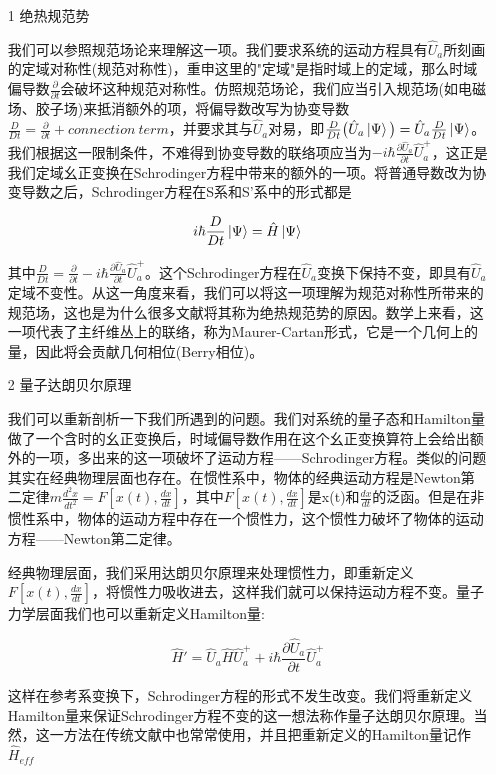 \documentclass[a4paper]{article}
\begin{document}
        \begin{itemize}
        \item[1] 绝热规范势 
            
            我们可以参照规范场论来理解这一项。我们要求系统的运动方程具有$\hat{U}_a$所刻画的定域对称性(规范对称性)，重申这里的"定域"是指时域上的定域，那么时域偏导数$\frac{\partial}{\partial t}$会破坏这种规范对称性。仿照规范场论，我们应当引入规范场(如电磁场、胶子场)来抵消额外的项，将偏导数改写为协变导数$\frac{D}{Dt}=\frac{\partial}{\partial t}+connection\ term$，并要求其与$\hat{U}_a$对易，即$\frac{D}{Dt}\big(\hat{U}_a\ket{\Psi}\big)=\hat{U}_a\frac{D}{Dt}\ket{\Psi}$。我们根据这一限制条件，不难得到协变导数的联络项应当为$-i\hbar\frac{\partial\hat{U}_a}{\partial t}\hat{U}_a^+$，这正是我们定域幺正变换在Schrodinger方程中带来的额外的一项。将普通导数改为协变导数之后，Schrodinger方程在S系和S'系中的形式都是

            \begin{equation}
                i\hbar\frac{D}{Dt}\ket{\Psi} = \hat{H}\ket{\Psi}
            \end{equation}

            其中$\frac{D}{Dt}=\frac{\partial}{\partial t}-i\hbar\frac{\partial\hat{U}_a}{\partial t}\hat{U}_a^+$。这个Schrodinger方程在$\hat{U}_a$变换下保持不变，即具有$\hat{U}_a$定域不变性。从这一角度来看，我们可以将这一项理解为规范对称性所带来的规范场，这也是为什么很多文献将其称为绝热规范势的原因。数学上来看，这一项代表了主纤维丛上的联络，称为Maurer-Cartan形式，它是一个几何上的量，因此将会贡献几何相位(Berry相位)。
        
        \item[2] 量子达朗贝尔原理
            
            我们可以重新剖析一下我们所遇到的问题。我们对系统的量子态和Hamilton量做了一个含时的幺正变换后，时域偏导数作用在这个幺正变换算符上会给出额外的一项，多出来的这一项破坏了运动方程——Schrodinger方程。类似的问题其实在经典物理层面也存在。在惯性系中，物体的经典运动方程是Newton第二定律$m\frac{d^2x}{dt^2}=F[x(t),\frac{dx}{dt}]$，其中$F[x(t),\frac{dx}{dt}]$是x(t)和$\frac{dx}{dt}$的泛函。但是在非惯性系中，物体的运动方程中存在一个惯性力，这个惯性力破坏了物体的运动方程——Newton第二定律。

            经典物理层面，我们采用达朗贝尔原理来处理惯性力，即重新定义$F[x(t),\frac{dx}{dt}]$，将惯性力吸收进去，这样我们就可以保持运动方程不变。量子力学层面我们也可以重新定义Hamilton量:
            
            \begin{equation}
                \hat{H}'=\hat{U}_a\hat{H}\hat{U}_a^+ + i\hbar\frac{\partial\hat{U}_a}{\partial t}\hat{U}_a^+
            \end{equation}

            这样在参考系变换下，Schrodinger方程的形式不发生改变。我们将重新定义Hamilton量来保证Schrodinger方程不变的这一想法称作量子达朗贝尔原理。当然，这一方法在传统文献中也常常使用，并且把重新定义的Hamilton量记作$\hat{H}_{eff}$
            
        \end{itemize}
\end{document}
